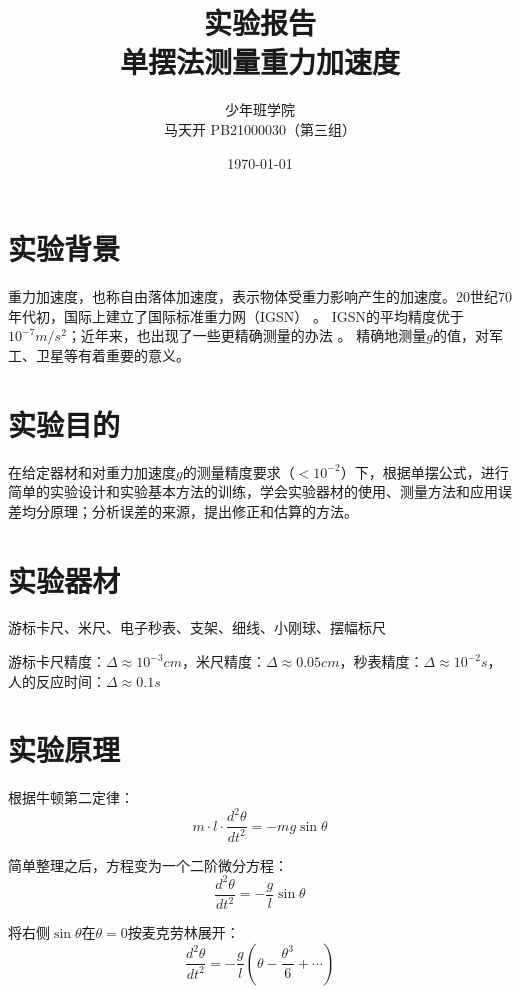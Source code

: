 \documentclass[a4paper]{ltxdoc}
\title{实验报告\\单摆法测量重力加速度}
\author{少年班学院\\马天开 PB21000030（第三组）}
\date{\today}
\begin{document}
\maketitle
\begin{multicols}{2}
  \section{实验背景}
  重力加速度，也称自由落体加速度，表示物体受重力影响产生的加速度。20世纪70年代初，国际上建立了国际标准重力网（IGSN）
  。
  IGSN的平均精度优于$10^{-7}m/s^2$；近年来，也出现了一些更精确测量的办法
  。
  精确地测量$g$的值，对军工、卫星等有着重要的意义。
  \section{实验目的}
  在给定器材和对重力加速度$g$的测量精度要求（$< 10^{-2}$）下，根据单摆公式，进行简单的实验设计和实验基本方法的训练，学会实验器材的使用、测量方法和应用误差均分原理；分析误差的来源，提出修正和估算的方法。
  \section{实验器材}
  游标卡尺、米尺、电子秒表、支架、细线、小刚球、摆幅标尺

  游标卡尺精度：$\Delta\approx 10^{-3}cm$，米尺精度：$\Delta\approx 0.05cm$，秒表精度：$\Delta\approx 10^{-2}s$，人的反应时间：$\Delta\approx 0.1s$
  \section{实验原理}
  根据牛顿第二定律：
  \begin{equation}
    m\cdot l\cdot \frac {d^2 \theta}{dt^2} = -mg\sin\theta
  \end{equation}

  简单整理之后，方程变为一个二阶微分方程：
  \begin{equation}
    \frac {d^2 \theta}{dt^2} = -\frac g l \sin\theta \label{XX}
  \end{equation}

  将右侧$\sin\theta$在$\theta = 0$按麦克劳林展开：
  \begin{equation}
    \frac {d^2 \theta}{dt^2} = -\frac g l (\theta - \frac {\theta^3} 6 +\cdots)
  \end{equation}


\end{multicols}
\end{document}
